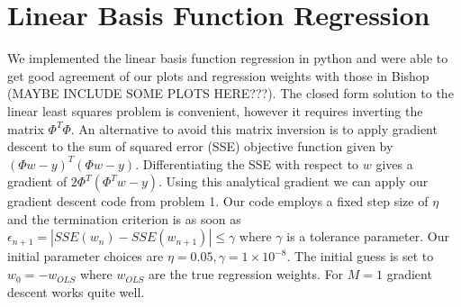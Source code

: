 \documentclass{article}
\begin{document}
 



\section{Linear Basis Function Regression}
We implemented the linear basis function regression in python and were able to get good agreement of our plots and regression weights with those in Bishop (MAYBE INCLUDE SOME PLOTS HERE???). The closed form solution to the linear least squares problem is convenient, however it requires inverting the matrix $\Phi^T \Phi$. An alternative to avoid this matrix inversion is to apply gradient descent to the sum of squared error (SSE) objective function given by $(\Phi w - y)^T(\Phi w - y)$. Differentiating the SSE with respect to $w$ gives a gradient of $2\Phi^T(\Phi^T w - y)$. Using this analytical gradient we can apply our gradient descent code from problem 1. Our code employs a fixed step size of $\eta$ and the termination criterion is as soon as $\epsilon_{n+1} = |SSE(w_n) - SSE(w_{n+1})| \leq \gamma $ where $\gamma$ is a tolerance parameter. Our initial parameter choices are $\eta = 0.05, \gamma = 1 \times 10^{-8}$. The initial guess is set to $w_0 = -w_{OLS}$ where $w_{OLS}$ are the true regression weights. For $M = 1$ gradient descent works quite well.
\end{document}
